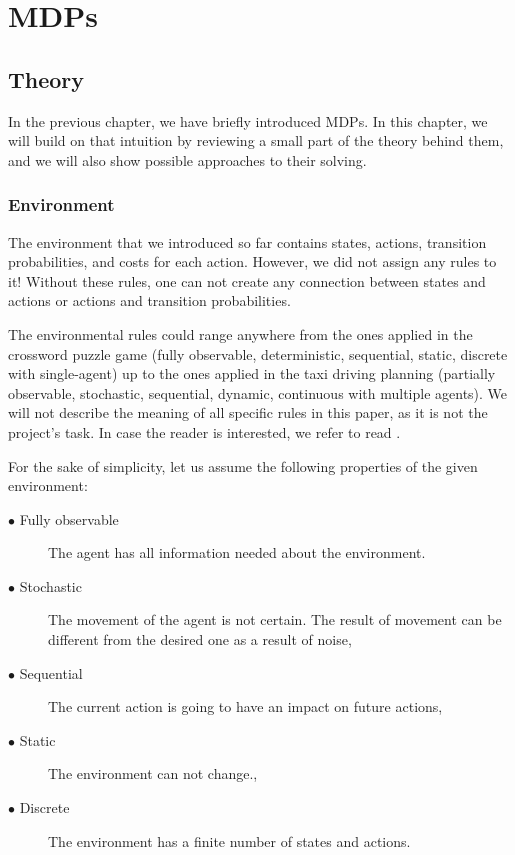 

\part{MDPs}

\chapter{Theory}

In the previous chapter, we have briefly introduced MDPs. In this chapter, we will build on that intuition by reviewing a small part of the theory behind them, and we will also show possible approaches to their solving.

\section{Environment}
The environment that we introduced so far contains states, actions, transition probabilities, and costs for each action. However, we did not assign any rules to it! 
Without these rules, one can not create any connection between states and actions or actions and transition probabilities.

The environmental rules could range anywhere from the ones applied in the crossword puzzle game (fully observable, deterministic, sequential, static, discrete with single-agent) up to the ones applied in the taxi driving planning (partially observable, stochastic, sequential, dynamic, continuous with multiple agents). We will not describe the meaning of all specific rules in this paper, as it is not the project's task. In case the reader is interested, we refer to read  \cite{russel2010}.

\newpage


For the sake of simplicity, let us assume the following properties of the given environment:
\begin{description}
  \item[$\bullet$ Fully observable] The agent has all information needed about the environment.
  \item[$\bullet$ Stochastic] The movement of the agent is not certain. The result of movement can be different from the desired one as a result of noise,
  \item[$\bullet$ Sequential] The current action is going to have an impact on future actions,
  \item[$\bullet$ Static] The environment can not change.,
  \item[$\bullet$ Discrete] The environment has a finite number of states and actions.
\end{description}



